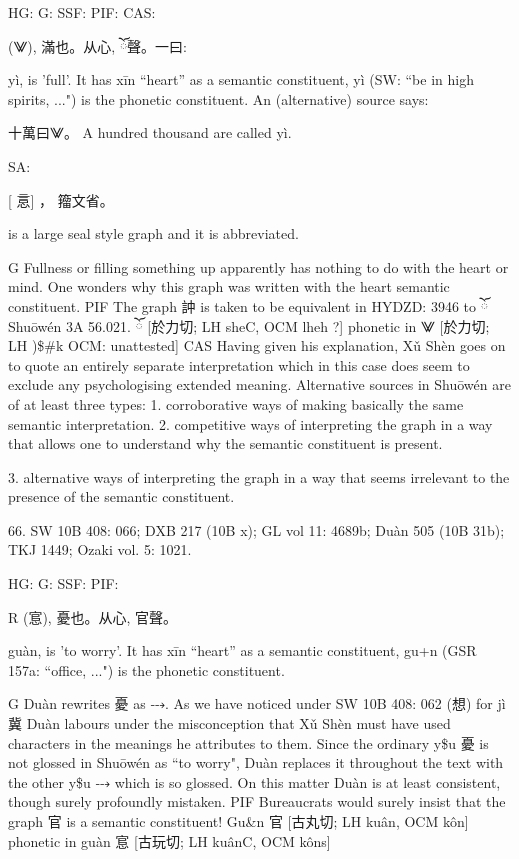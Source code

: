 HG:
G: SSF:
PIF:
CAS:

(⨈),
滿也。从心,
ོ聲。一曰:

yì,
is 'full'.
It has xīn ``heart'' as a semantic constituent,
yì (SW: ``be in high spirits, ...") is the phonetic constituent. An (alternative) source says:

十萬曰⨈。 A hundred thousand are called yì.

SA:
    
[ 悥] ， 籀文省。

is a large seal style graph and it is abbreviated.

G Fullness or filling something up apparently has nothing to do with the heart or mind. One wonders why this graph was written with the heart semantic constituent.
PIF The graph 訲 is taken to be equivalent in HYDZD: 3946 to ོ Shuōwén 3A 56.021.
ོ [於力切; LH sheC, OCM lheh ?] phonetic in ⨈ [於力切; LH )\$\#k OCM: unattested]
CAS Having given his explanation, Xǔ Shèn goes on to quote an entirely separate interpretation which in this case does seem to exclude any psychologising extended meaning. Alternative sources in Shuōwén are of at least three types:
1. corroborative ways of making basically the same semantic interpretation.
2. competitive ways of interpreting the graph in a way that allows one to understand why the semantic constituent is present.




3. alternative ways of interpreting the graph in a way that seems irrelevant to the presence of the semantic constituent.

66. SW 10B 408: 066; DXB 217 (10B x); GL vol 11: 4689b; Duàn 505 (10B 31b); TKJ 1449; Ozaki vol. 5: 1021.


HG:
G: SSF: PIF:

R (悹),
憂也。从心, 官聲。


guàn,
is 'to worry'.
It has xīn ``heart'' as a semantic constituent,
gu+n (GSR 157a: ``office, ...") is the phonetic constituent.

G Duàn rewrites 憂 as ⤏. As we have noticed under SW 10B 408: 062 (想) for jì 冀 Duàn labours under the misconception that Xǔ Shèn must have used characters in the meanings he attributes to them. Since the ordinary y\$u 憂 is not glossed in Shuōwén as ``to worry", Duàn replaces it throughout the text with the other y\$u ⤏ which is so glossed. On this matter Duàn is at least consistent, though surely profoundly mistaken.
PIF  Bureaucrats would surely insist that the graph 官 is a semantic constituent!
Gu&n 官 [古丸切; LH kuân, OCM kôn] phonetic in guàn 悹 [古玩切; LH kuânC, OCM kôns]


